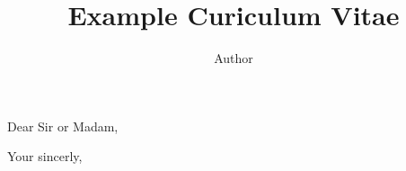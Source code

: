 \documentclass[a4paper]{arthur-cover-letter}
\title{Example Curiculum Vitae}
\author{Author}
\begin{document}
    \makeprofile %
    
    \address{John \\123, somestreet\\Somecity}


    \begin{coverletter}

            \subject{Application to job of my life}

            \opening{Dear Sir or Madam,}

            \lipsum[1-3] %

            \closing{Your sincerly,} %


    \end{coverletter}
\end{document}
